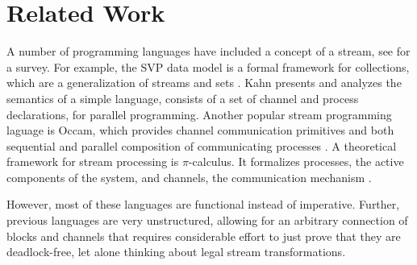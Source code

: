 \section{Related Work}
A number of programming languages have included a concept of a stream,
see \cite{survey97} for a survey.  
For example, the SVP data model is a formal framework for collections,
which are a generalization of streams and sets \cite{Par92}.  Kahn
presents and analyzes the semantics of a simple language, consists of
a set of channel and process declarations, for parallel
programming\cite{Kah74}.  Another popular stream programming laguage
is Occam, which provides channel communication primitives and both
sequential and parallel composition of communicating processes
\cite{Jif93}.  A theoretical framework for stream processing is
$\pi$-calculus.  It formalizes processes, the active components of the
system, and channels, the communication mechanism
\cite{Pie97}. 

However, most of these languages are functional instead of imperative.
Further, previous languages are very unstructured, allowing for an
arbitrary connection of blocks and channels that requires considerable
effort to just prove that they are deadlock-free, let alone thinking
about legal stream transformations.


